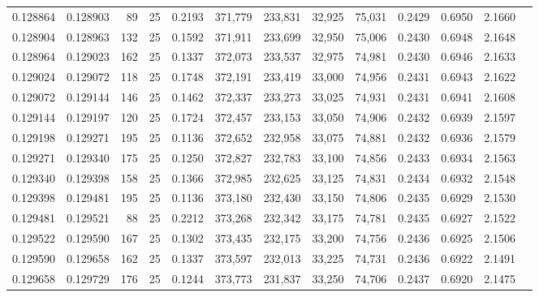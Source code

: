 \begin{tabular}{rrrrrrrrrrrrr}
0.128864 & 0.128903 &    89 &  25 &                                     0.2193 & 371,779 & 233,831 &  32,925 &  75,031 & 0.2429 & 0.6950 & 2.1660 \\
0.128904 & 0.128963 &   132 &  25 &                                     0.1592 & 371,911 & 233,699 &  32,950 &  75,006 & 0.2430 & 0.6948 & 2.1648 \\
0.128964 & 0.129023 &   162 &  25 &                                     0.1337 & 372,073 & 233,537 &  32,975 &  74,981 & 0.2430 & 0.6946 & 2.1633 \\
0.129024 & 0.129072 &   118 &  25 &                                     0.1748 & 372,191 & 233,419 &  33,000 &  74,956 & 0.2431 & 0.6943 & 2.1622 \\
0.129072 & 0.129144 &   146 &  25 &                                     0.1462 & 372,337 & 233,273 &  33,025 &  74,931 & 0.2431 & 0.6941 & 2.1608 \\
0.129144 & 0.129197 &   120 &  25 &                                     0.1724 & 372,457 & 233,153 &  33,050 &  74,906 & 0.2432 & 0.6939 & 2.1597 \\
0.129198 & 0.129271 &   195 &  25 &                                     0.1136 & 372,652 & 232,958 &  33,075 &  74,881 & 0.2432 & 0.6936 & 2.1579 \\
0.129271 & 0.129340 &   175 &  25 &                                     0.1250 & 372,827 & 232,783 &  33,100 &  74,856 & 0.2433 & 0.6934 & 2.1563 \\
0.129340 & 0.129398 &   158 &  25 &                                     0.1366 & 372,985 & 232,625 &  33,125 &  74,831 & 0.2434 & 0.6932 & 2.1548 \\
0.129398 & 0.129481 &   195 &  25 &                                     0.1136 & 373,180 & 232,430 &  33,150 &  74,806 & 0.2435 & 0.6929 & 2.1530 \\
0.129481 & 0.129521 &    88 &  25 &                                     0.2212 & 373,268 & 232,342 &  33,175 &  74,781 & 0.2435 & 0.6927 & 2.1522 \\
0.129522 & 0.129590 &   167 &  25 &                                     0.1302 & 373,435 & 232,175 &  33,200 &  74,756 & 0.2436 & 0.6925 & 2.1506 \\
0.129590 & 0.129658 &   162 &  25 &                                     0.1337 & 373,597 & 232,013 &  33,225 &  74,731 & 0.2436 & 0.6922 & 2.1491 \\
0.129658 & 0.129729 &   176 &  25 &                                     0.1244 & 373,773 & 231,837 &  33,250 &  74,706 & 0.2437 & 0.6920 & 2.1475 \\

\end{tabular}
